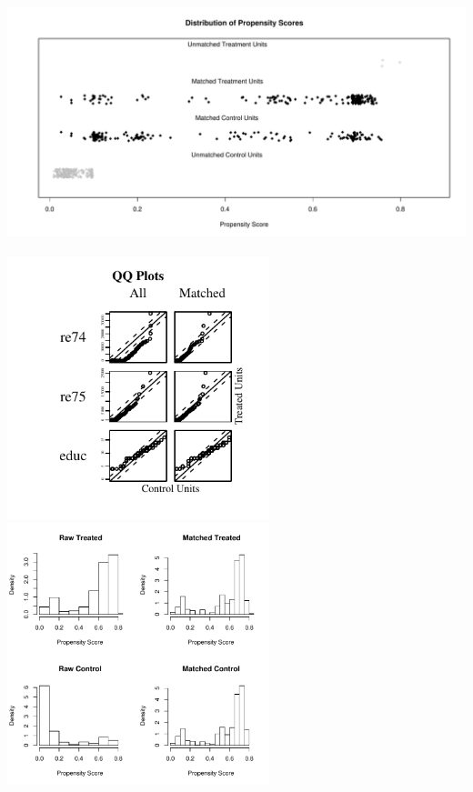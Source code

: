 \hspace{-0.75in}
\begin{center}
\includegraphics[height=3in]{figs/jitterplotnn}\\
\includegraphics[height=3in]{figs/qqplotnn1}
\includegraphics[height=3in]{figs/hist}
\end{center}

